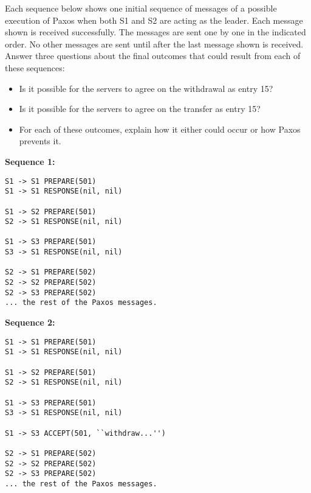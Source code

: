 \documentclass{article}
\begin{document}
\begin{enumerate}
Each sequence below shows one initial sequence of messages of a possible execution of Paxos when both S1 and S2 are acting as the leader.  Each message shown is received successfully.  The messages are sent one by one in the indicated order.  No other messages are sent until after the last message shown is received.\\

Answer three questions about the final outcomes that could result from each of these sequences:
\begin{itemize}
  \item Is it possible for the servers to agree on the withdrawal as entry 15?
  \item Is it possible for the servers to agree on the transfer as entry 15?
  \item For each of these outcomes, explain how it either could occur or how Paxos prevents it.
\end{itemize}

\textbf{Sequence 1:}

\begin{verbatim}
S1 -> S1 PREPARE(501) 
S1 -> S1 RESPONSE(nil, nil)

S1 -> S2 PREPARE(501) 
S2 -> S1 RESPONSE(nil, nil)

S1 -> S3 PREPARE(501) 
S3 -> S1 RESPONSE(nil, nil)

S2 -> S1 PREPARE(502) 
S2 -> S2 PREPARE(502) 
S2 -> S3 PREPARE(502) 
... the rest of the Paxos messages.
\end{verbatim}

\textbf{Sequence 2:}

\begin{verbatim}
S1 -> S1 PREPARE(501) 
S1 -> S1 RESPONSE(nil, nil)

S1 -> S2 PREPARE(501) 
S2 -> S1 RESPONSE(nil, nil)

S1 -> S3 PREPARE(501) 
S3 -> S1 RESPONSE(nil, nil)

S1 -> S3 ACCEPT(501, ``withdraw...'') 

S2 -> S1 PREPARE(502) 
S2 -> S2 PREPARE(502) 
S2 -> S3 PREPARE(502)
... the rest of the Paxos messages.
\end{verbatim}


\end{enumerate}


\end{document}
